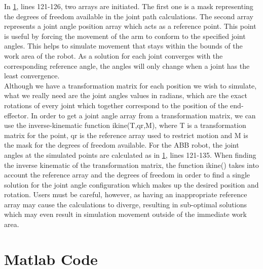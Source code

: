 \documentclass[11pt,a4paper]{report}
\begin{document}
In \cref{Matlab}, lines 121-126, two arrays are initiated. The first one is a mask representing the degrees of freedom available in the joint path calculations. The second array represents a joint angle position array which acts as a reference point. This point is useful by forcing the movement of the arm to conform to the specified joint angles. This helps to simulate movement that stays within the bounds of the work area of the robot. As a solution for each joint converges with the corresponding reference angle, the angles will only change when a joint has the least convergence.\\
Although we have a transformation matrix for each position we wish to simulate, what we really need are the joint angles values in radians, which are the exact rotations of every joint which together correspond to the position of the end-effector. In order to get a joint angle array from a transformation matrix, we can use the inverse-kinematic function ikine(T,qr,M), where T is a transformation matrix for the point, qr is the reference array used to restrict motion and M is the mask for the degrees of freedom available. For the ABB robot, the joint angles at the simulated points are calculated as in \cref{Matlab}, lines 121-135. When finding the inverse kinematic of the transformation matrix, the function ikine() takes into account the reference array and the degrees of freedom in order to find a single solution for the joint angle configuration which makes up the desired position and rotation. Users must be careful, however, as having an inappropriate reference array may cause the calculations to diverge, resulting in sub-optimal solutions which may even result in simulation movement outside of the immediate work area.\\ 
 

\appendix
\chapter{Matlab Code}
\label{Matlab}
\lstset{numbers = left,
numbersep=5pt}
\end{document}
